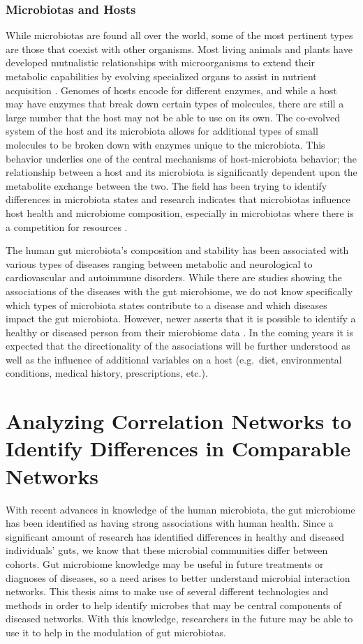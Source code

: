 \subsubsection{Microbiotas and Hosts}\label{intro-allbiota}
While microbiotas are found all over the world, some of the most pertinent types are those that coexist with other organisms. Most living animals and plants have developed mutualistic relationships with microorganisms to extend their metabolic capabilities by evolving specialized organs to assist in nutrient acquisition \citep{Hacquard2015}. Genomes of hosts encode for different enzymes, and while a host may have enzymes that break down certain types of molecules, there are still a large number that the host may not be able to use on its own. The co-evolved system of the host and its microbiota allows for additional types of small molecules to be broken down with enzymes unique to the microbiota. This behavior underlies one of the central mechanisms of host-microbiota behavior; the relationship between a host and its microbiota is significantly dependent upon the metabolite exchange between the two. The field has been trying to identify differences in microbiota states and research indicates that microbiotas influence host health and microbiome composition, especially in microbiotas where there is a competition for resources \citep{Hacquard2015}. 

The human gut microbiota's composition and stability has been associated with various types of diseases ranging between metabolic and neurological to cardiovascular and autoimmune disorders. While there are studies showing the associations of the diseases with the gut microbiome, we do not know specifically which types of microbiota states contribute to a disease and which diseases impact the gut microbiota. However, newer asserts that it is possible to identify a healthy or diseased person from their microbiome data \citep{Duvallet2017}. In the coming years it is expected that the directionality of the associations will be further understood as well as the influence of additional variables on a host (e.g.\ diet, environmental conditions, medical history, prescriptions, etc.).

\section{Analyzing Correlation Networks to Identify Differences in Comparable Networks}\label{intro-overall}

With recent advances in knowledge of the human microbiota, the gut microbiome has been identified as having strong associations with human health. Since a significant amount of research has identified differences in healthy and diseased individuals' guts, we know that these microbial communities differ between cohorts. Gut microbiome knowledge may be useful in future treatments or diagnoses of diseases, so a need arises to better understand microbial interaction networks. This thesis aims to make use of several different technologies and methods in order to help identify microbes that may be central components of diseased networks. With this knowledge, researchers in the future may be able to use it to help in the modulation of gut microbiotas.

